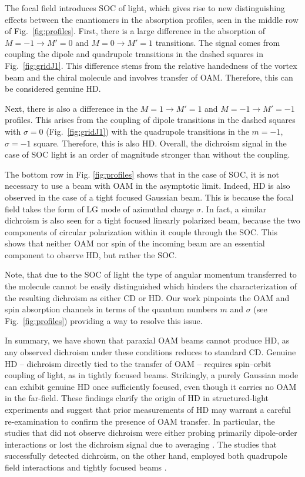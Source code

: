 \documentclass[reprint,aps,prl,twocolumn,superscriptaddress,groupedaddress]{revtex4-2}
\begin{document}
The focal field introduces SOC of light, which gives rise to new distinguishing effects between the enantiomers in the absorption profiles, seen in the middle row of Fig.~\ref{fig:profiles}. First, there is a large difference in the absorption of $M=-1\to M'=0$ and $M=0\to M'=1$ transitions. The signal comes from coupling the dipole and quadrupole transitions in the dashed squares in Fig.~\ref{fig:gridJ1}. This difference stems from the relative handedness of the vortex beam and the chiral molecule and involves transfer of OAM. Therefore, this can be considered genuine HD.

Next, there is also a difference in the $M=1\to M'=1$ and $M=-1\to M'=-1$ profiles. This arises from the coupling of dipole transitions in the dashed squares with $\sigma=0$ (Fig.~\ref{fig:gridJ1}) with the quadrupole transitions in the $m=-1$, $\sigma=-1$ square. Therefore, this is also HD. Overall, the dichroism signal in the case of SOC light is an order of magnitude stronger than without the coupling.

The bottom row in Fig. \ref{fig:profiles} shows that in the case of SOC, it is not necessary to use a beam with OAM in the asymptotic limit. Indeed, HD is also observed in the case of a tight focused Gaussian beam. This is because the focal field takes the form of LG mode of azimuthal charge $\sigma$. In fact, a similar dichroism is also seen for a tight focused linearly polarized beam, because the two components of circular polarization within it couple through the SOC. This shows that neither OAM nor spin of the incoming beam are an essential component to observe HD, but rather the SOC.

Note, that due to the SOC of light the type of angular momentum transferred to the molecule cannot be easily distinguished which hinders the characterization of the resulting dichroism as either CD or HD. Our work pinpoints the OAM and spin absorption channels in terms of the quantum numbers $m$ and $\sigma$ (see Fig.~\ref{fig:profiles}) providing a way to resolve this issue.





In summary, we have shown that paraxial OAM beams cannot produce HD, as any observed dichroism under these conditions reduces to standard CD. Genuine HD -- dichroism directly tied to the transfer of OAM -- requires spin–orbit coupling of light, as in tightly focused beams. Strikingly, a purely Gaussian mode can exhibit genuine HD once sufficiently focused, even though it carries no OAM in the far-field. These findings clarify the origin of HD in structured-light experiments and suggest that prior measurements of HD may warrant a careful re-examination to confirm the presence of OAM transfer. In particular, the studies that did not observe dichroism were either probing primarily dipole-order interactions \cite{Araoka2005} or lost the dichroism signal due to averaging \cite{Loeffler2011}. The studies that successfully detected dichroism, on the other hand, employed both quadrupole field interactions and tightly focused beams \cite{Rusak2019,Rouxel2022,Begin2023,Jain2023}. 
\end{document}
